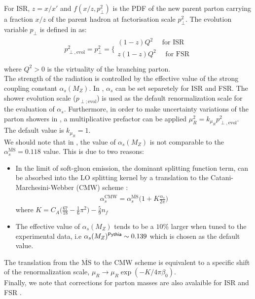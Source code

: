 For ISR, $z=x/x'$ and $f(x/z,p_\perp^2)$ is the PDF of the new parent parton carrying a fraction $x/z$
of the parent hadron at factorisation scale $p_\perp^2$. The evolution variable $p_\perp$ is defined in 
\Pythia as:
\begin{eqnarray}
 p_{\perp,\text{evol}}^2 = p_\perp^2 = \bigg\{ \begin{array}{c}
                            (1-z) Q^2 \quad \text{ for ISR} \\
                            z (1-z) Q^2 \quad \text{ for FSR} \\
                           \end{array}
\end{eqnarray}
where $Q^2 > 0$ is the virtuality of the branching parton. \\
The strength of the radiation is controlled by the effective value of the 
strong coupling constant $\alpha_s(M_Z)$. In \Pythia, $\alpha_s$ can be 
set separetely for ISR and FSR. The shower evolution scale ($p_{\perp;\mathrm{evol}}$) is used as the default renormalization scale
for the evaluation of $\alpha_s$. Furthermore,
in order to make uncertainty variations of the parton showers in \Pythia, a 
multiplicative prefactor can be applied $\mu_R^2 = k_{\mu_R} p_{\perp, \text{evol}}^2$. The default 
value is $k_{\mu_R} = 1$. \\
We should note that in \Pythia, the value of $\alpha_s(M_Z)$ is not comparable
to the $\alpha_s^{\overline{\text{MS}}}=0.118$ value. This is due to two reasons:
\begin{itemize}
 \item In the limit of soft-gluon emission, the dominant splitting function
   term, can be absorbed into the LO splitting kernel by a translation to the
   Catani-Marchesini-Webber (CMW) scheme \cite{Catani:1990rr}:
 \begin{eqnarray}
  \alpha_s^{\text{CMW}} = \alpha_s^{\overline{\text{MS}}} \bigg(1 + K \frac{\alpha_s}{2 \pi} \bigg)
 \end{eqnarray}
where $K = C_A \bigg(\frac{67}{18} - \frac{1}{6} \pi^2 \bigg) - \frac{5}{9} n_f$
\item The effective value of $\alpha_s(M_Z)$ tends to be a $10\%$ larger when tuned to the experimental
data, i.e $\alpha_s(M_Z)^{\protect\textsf{Pythia}} \sim 0.139$ which is chosen as the default value.
\end{itemize}
The translation from the $\overline{\text{MS}}$ to the CMW scheme is equivalent
to a specific shift of the renormalization scale, $\mu_R \to \mu_R \exp(-K/4\pi\beta_0)$. \\
Finally, we note that corrections for parton masses are also avalaible for ISR \cite{Sjostrand:2004ef} 
and FSR \cite{Norrbin:2000uu}.


